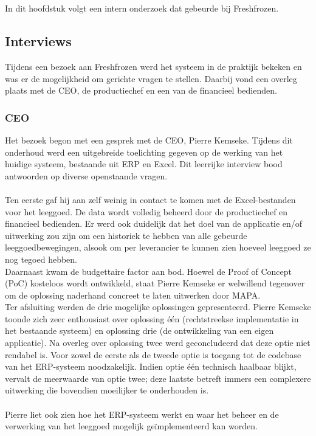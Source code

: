 \chapter{}
\label{ch:fase0}

In dit hoofdstuk volgt een intern onderzoek dat gebeurde bij Freshfrozen.

\section{Interviews}
Tijdens een bezoek aan Freshfrozen werd het systeem in de praktijk bekeken en was er de mogelijkheid om gerichte vragen te stellen. Daarbij vond een overleg plaats met de CEO, de productiechef en een van de financieel bedienden.
\subsection{CEO}
Het bezoek begon met een gesprek met de CEO, Pierre Kemseke. Tijdens dit onderhoud werd een uitgebreide toelichting gegeven op de werking van het huidige systeem, bestaande uit ERP en Excel. Dit leerrijke interview bood antwoorden op diverse openstaande vragen.
\\
\\
Ten eerste gaf hij aan zelf weinig in contact te komen met de Excel-bestanden voor het leeggoed. De data wordt volledig beheerd door de productiechef en financieel bedienden. Er werd ook duidelijk dat het doel van de applicatie en/of uitwerking zou zijn om een historiek te hebben van alle gebeurde leeggoedbewegingen, alsook om per leverancier te kunnen zien hoeveel leeggoed ze nog tegoed hebben.
\\
Daarnaast kwam de budgettaire factor aan bod. Hoewel de Proof of Concept (PoC) kosteloos wordt ontwikkeld, staat Pierre Kemseke er welwillend tegenover om de oplossing naderhand concreet te laten uitwerken door MAPA.
\\
Ter afsluiting werden de drie mogelijke oplossingen gepresenteerd. Pierre Kemseke toonde zich zeer enthousiast over oplossing één (rechtstreekse implementatie in het bestaande systeem) en oplossing drie (de ontwikkeling van een eigen applicatie). Na overleg over oplossing twee werd geconcludeerd dat deze optie niet rendabel is. Voor zowel de eerste als de tweede optie is toegang tot de codebase van het ERP-systeem noodzakelijk. Indien optie één technisch haalbaar blijkt, vervalt de meerwaarde van optie twee; deze laatste betreft immers een complexere uitwerking die bovendien moeilijker te onderhouden is.
\\
\\
Pierre liet ook zien hoe het ERP-systeem werkt en waar het beheer en de verwerking van het leeggoed mogelijk geïmplementeerd kan worden.

